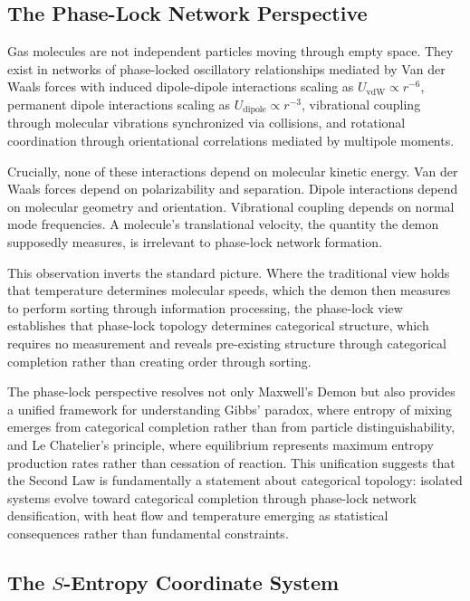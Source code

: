 \documentclass[12pt,a4paper]{article}
\theoremstyle{definition}
\theoremstyle{remark}
\begin{document}
\subsection{The Phase-Lock Network Perspective}

Gas molecules are not independent particles moving through empty space. They exist in networks of phase-locked oscillatory relationships mediated by Van der Waals forces with induced dipole-dipole interactions scaling as $U_{\text{vdW}} \propto r^{-6}$, permanent dipole interactions scaling as $U_{\text{dipole}} \propto r^{-3}$, vibrational coupling through molecular vibrations synchronized via collisions, and rotational coordination through orientational correlations mediated by multipole moments.

Crucially, none of these interactions depend on molecular kinetic energy. Van der Waals forces depend on polarizability and separation. Dipole interactions depend on molecular geometry and orientation. Vibrational coupling depends on normal mode frequencies. A molecule's translational velocity, the quantity the demon supposedly measures, is irrelevant to phase-lock network formation.

This observation inverts the standard picture. Where the traditional view holds that temperature determines molecular speeds, which the demon then measures to perform sorting through information processing, the phase-lock view establishes that phase-lock topology determines categorical structure, which requires no measurement and reveals pre-existing structure through categorical completion rather than creating order through sorting.

The phase-lock perspective resolves not only Maxwell's Demon but also provides a unified framework for understanding Gibbs' paradox, where entropy of mixing emerges from categorical completion rather than from particle distinguishability, and Le Chatelier's principle, where equilibrium represents maximum entropy production rates rather than cessation of reaction. This unification suggests that the Second Law is fundamentally a statement about categorical topology: isolated systems evolve toward categorical completion through phase-lock network densification, with heat flow and temperature emerging as statistical consequences rather than fundamental constraints.

\subsection{The $S$-Entropy Coordinate System}
\end{document}

